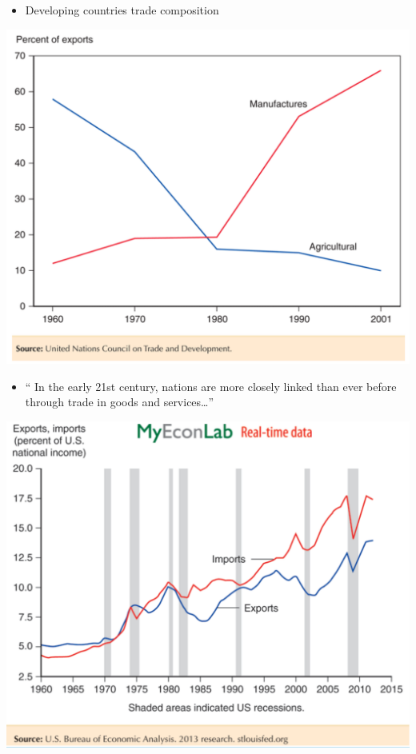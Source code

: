 \documentclass[ignorenonframetext,]{beamer}
\begin{document}
\begin{frame}

    \begin{itemize}
        \item Developing countries trade composition 
    \end{itemize}
    
    \includegraphics[scale=0.20]{developing_country_comp_adv.png}

\end{frame}

\begin{frame}

    \begin{itemize}
        \itemsep1pt\parskip0pt
        \item `` In the early 21st century, nations are more closely linked than ever before through trade in goods and services\dots''
    \end{itemize}
   
    \includegraphics[scale=0.25]{figure1-1.png}

\end{frame}
    
\end{document}
